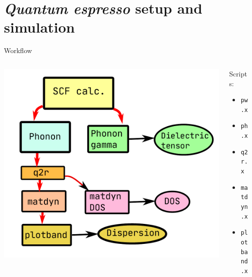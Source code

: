 \documentclass[dvipsnames]{beamer}
\begin{document}
	\section{\textit{Quantum espresso} setup and simulation}
	
	    \begin{frame}{Workflow}
	    \begin{columns}[T] %
	    \begin{column}{.70\textwidth}
	    \includegraphics[scale=0.5]{steps.pdf}
	    \end{column}
	    \begin{column}{.30\textwidth}
	    Scripts:
	    \begin{itemize}
	    \item \texttt{pw.x}
	    \item \texttt{ph.x}
	    \item \texttt{q2r.x}
	    \item \texttt{matdyn.x}
	    \item \texttt{plotband.x}
	    \end{itemize}
	    \end{column}
	    \end{columns}
	    \end{frame}
	    
\end{document}
